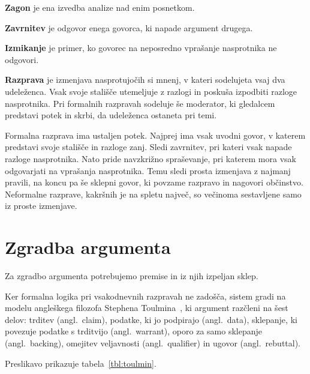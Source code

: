 \documentclass[a4paper, 12pt]{book}
\begin{document}
\textbf{Zagon} je ena izvedba analize nad enim posnetkom.

\textbf{Zavrnitev} je odgovor enega govorca, ki napade argument drugega.

\textbf{Izmikanje} je primer, ko govorec na neposredno vprašanje nasprotnika ne odgovori. 

\textbf{Razprava} je izmenjava nasprotujočih si mnenj, v kateri sodelujeta vsaj
dva udeleženca. Vsak svoje stališče utemeljuje z razlogi in poskuša izpodbiti
razloge nasprotnika. Pri formalnih razpravah sodeluje še moderator, ki gledalcem
predstavi potek in skrbi, da udeleženca ostaneta pri temi.

Formalna razprava ima ustaljen potek. Najprej ima vsak uvodni govor, v katerem
predstavi svoje stališče in razloge zanj. Sledi zavrnitev, pri kateri vsak
napade razloge nasprotnika. Nato pride navzkrižno spraševanje, pri katerem mora
vsak odgovarjati na vprašanja nasprotnika. Temu sledi prosta izmenjava z najmanj
pravili, na koncu pa še sklepni govor, ki povzame razpravo in nagovori
občinstvo. Neformalne razprave, kakršnih je na spletu največ, so večinoma
sestavljene samo iz proste izmenjave.


\section{Zgradba argumenta}
\label{sec:zgradba-argumenta}
Za zgradbo argumenta potrebujemo premise in iz njih izpeljan sklep.

Ker formalna logika pri vsakodnevnih razpravah ne zadošča, sistem gradi na modelu angleškega filozofa Stephena Toulmina~\cite{toulmin1958}, ki argument razčleni na šest delov: trditev (angl.\ claim), podatke, ki jo podpirajo (angl.\ data), sklepanje, ki povezuje podatke s trditvijo (angl.\ warrant), oporo za samo sklepanje (angl.\ backing), omejitev veljavnosti (angl.\ qualifier) in ugovor (angl.\ rebuttal).

Preslikavo prikazuje tabela~\ref{tbl:toulmin}.
\end{document}
